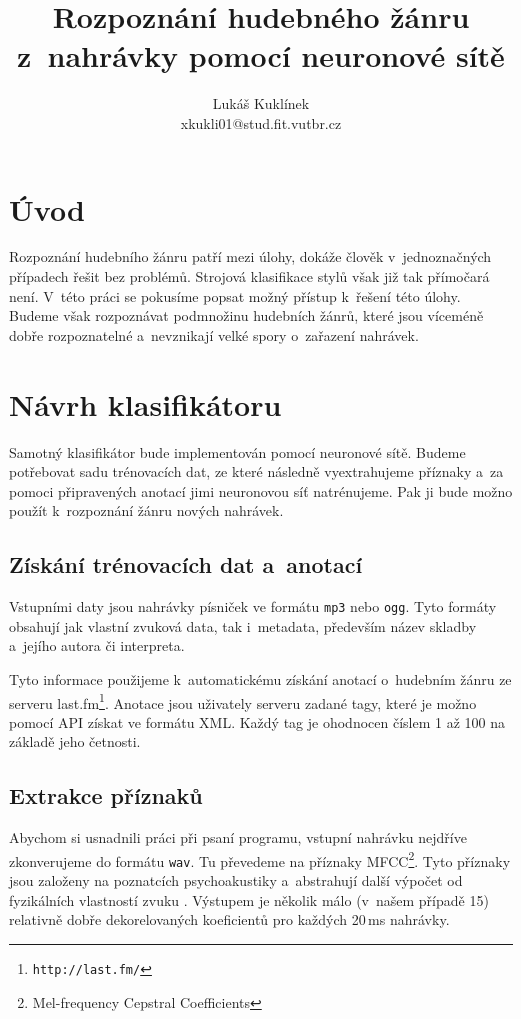 \documentclass[10pt,a4paper,twocolumn]{article}
\title{Rozpoznání hudebného žánru z~nahrávky pomocí neuronové sítě}
\author{Lukáš Kuklínek\\xkukli01@stud.fit.vutbr.cz}
\date{}
\begin{document}
\maketitle

\section{Úvod}

Rozpoznání hudebního žánru patří mezi úlohy, dokáže člověk v~jednoznačných případech řešit bez problémů.
Strojová klasifikace stylů však již tak přímočará není.
V~této práci se pokusíme popsat možný přístup k~řešení této úlohy.
Budeme však rozpoznávat podmnožinu hudebních žánrů, které jsou víceméně dobře rozpoznatelné
a~nevznikají velké spory o~zařazení nahrávek.

\section{Návrh klasifikátoru}

Samotný klasifikátor bude implementován pomocí neuronové sítě.
Budeme potřebovat sadu trénovacích dat, ze které následně vyextrahujeme příznaky
a~za pomoci připravených anotací jimi neuronovou síť natrénujeme.
Pak ji bude možno použít k~rozpoznání žánru nových nahrávek.

\subsection{Získání trénovacích dat a~anotací}

Vstupními daty jsou nahrávky písniček ve formátu \verb|mp3| nebo \verb|ogg|.
Tyto formáty obsahují jak vlastní zvuková data, tak i~metadata, především název
skladby a~jejího autora či interpreta.

Tyto informace použijeme k~automatickému získání anotací
o~hudebním žánru ze serveru last.fm\footnote{\texttt{http://last.fm/}}.
Anotace jsou uživately serveru zadané tagy, které je možno pomocí API získat ve formátu XML.
Každý tag je ohodnocen číslem 1 až 100 na základě jeho četnosti.

\subsection{Extrakce příznaků}

Abychom si usnadnili práci při psaní programu,
vstupní nahrávku nejdříve zkonverujeme do formátu \verb|wav|.
Tu převedeme na příznaky MFCC\footnote{Mel-frequency Cepstral Coefficients}.
Tyto příznaky jsou založeny na poznatcích psychoakustiky a~abstrahují
další výpočet od fyzikálních vlastností zvuku \cite{mfcc}.
Výstupem je několik málo (v~našem případě 15) relativně dobře dekorelovaných koeficientů
pro každých 20\,ms nahrávky.
\end{document}
